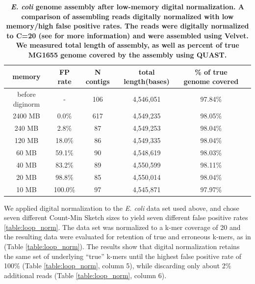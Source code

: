\begin{table}[!ht]
\small
\caption{
\bf{{\em E. coli} genome assembly after low-memory digital normalization.
  A comparison of assembling reads digitally normalized with low memory/high
  false positive rates.  The reads were digitally normalized to 
  C=20 (see
  \cite{Brown2012} for more information) and were assembled using Velvet.
  We measured total length of assembly,
  as well as percent of true MG1655 genome covered by the assembly using QUAST.}}
\begin{tabular}{ | c | c | c | c | c | c |}
\hline
memory   & FP rate & N contigs & total length(bases) & \% of true genome covered \\
\hline
before diginorm  &-   & 106 & 4,546,051 & 97.84\% \\
    2400 MB  &  0.0\% & 617 & 4,549,235 & 98.05\% \\
     240 MB  &  2.8\% &  87 & 4,549,253 & 98.04\% \\
     120 MB  & 18.0\% &  86 & 4,549,335 & 98.04\% \\
      60 MB  & 59.1\% &  90 & 4,548,619 & 98.03\% \\
      40 MB  & 83.2\% &  89 & 4,550,599 & 98.11\% \\
      20 MB  & 98.8\% &  85 & 4,550,014 & 98.04\% \\
      10 MB  &100.0\% &  97 & 4,545,871 & 97.97\% \\
\end{tabular}
\begin{flushleft}
\end{flushleft}
\label{table:assembly}
\end{table}

We applied digital normalization to the {\em E. coli} data set used above, and
chose seven different Count-Min Sketch sizes to yield seven different false
positive rates \ref{table:loop_norm}.  The data set was normalized to a k-mer
coverage of 20 and the resulting data were evaluated for retention of true and
erroneous k-mers, as in \cite{Brown2012} (Table \ref{table:loop_norm}).  The
results show that digital normalization retains the same set of underlying
``true'' k-mers until the highest false positive rate of 100\% (Table
\ref{table:loop_norm}, column 5), while discarding only about 2\% additional
reads (Table \ref{table:loop_norm}, column 6).

